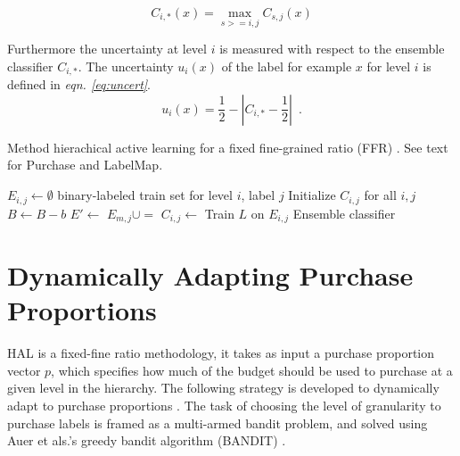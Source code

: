 \documentclass[ms]{nuthesis}
\begin{document}
\begin{equation}
\label{eq:maxcombine}
  C_{i,*}(x) = \max_{s>=i,j} C_{s,j}(x)
\end{equation}


Furthermore the uncertainty at level $i$
is measured with respect to the ensemble classifier $C_{i,*}$. The
uncertainty $u_i(x)$ of the label for example $x$ for level $i$ is defined
in \textit{eqn. \ref{eq:uncert}}.
\begin{equation}
\label{eq:uncert}
 u_i(x) = \frac{1}{2} - \left| C_{i,*} - \frac{1}{2} \right|
\enspace .
\end{equation}



\begin{algorithm}[!htb]
\small{
\caption{Method hierachical active learning for a fixed
fine-grained ratio (FFR) \cite{yugi}.
See text for Purchase and LabelMap.
}
\label{alg:halalgo}
\begin{algorithmic}
\State  $E_{i,j} \gets \emptyset$  \Comment binary-labeled train set for
level $i$, label $j$
\State Initialize $C_{i,j}$ for all $i, j$
  \State $B \gets B-b$
    \State $E' \gets$ 
           \State $E_{m,j} \cup=$ 
       \EndFor
    \EndFor
  \EndFor
    \State $C_{i,j} \gets$ Train $L$ on $E_{i,j}$
  \EndFor
  \EndFor
\EndWhile
\State \Return Ensemble classifier
\EndFunction
\end{algorithmic}
}
\end{algorithm}

\section{Dynamically Adapting Purchase Proportions}
HAL is a fixed-fine ratio methodology, it takes as input a purchase proportion
vector $p$, which specifies how much of the budget should be used to purchase at
a given level in the hierarchy. The following strategy is developed to
dynamically adapt to purchase proportions \cite{yugi}. The task of choosing the
level of granularity to purchase labels is framed as a multi-armed bandit problem,
and solved using Auer et als.'s greedy bandit algorithm (BANDIT) \cite{Auer2002}.
\end{document}
